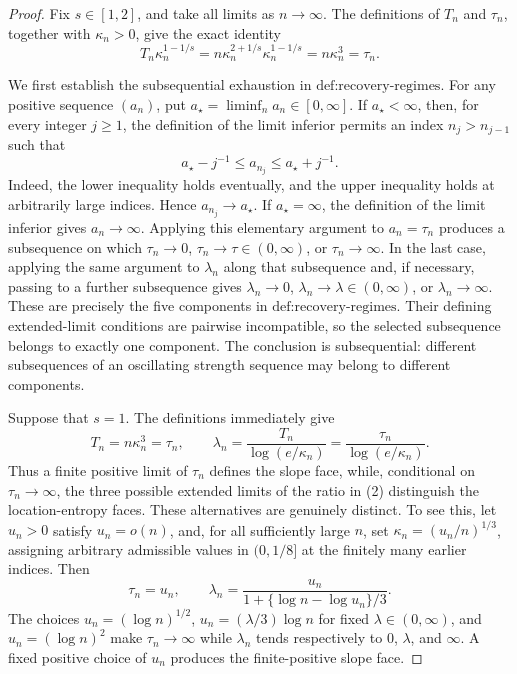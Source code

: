 \documentclass{article}
\begin{document}
\begin{proof}
Fix \(s\in[1,2]\), and take all limits as \(n\to\infty\).  The definitions of \(T_n\) and \(\tau_n\), together with \(\kappa_n>0\), give the exact identity
\[
 T_n\kappa_n^{1-1/s}
 =n\kappa_n^{2+1/s}\kappa_n^{1-1/s}
 =n\kappa_n^3
 =\tau_n.
 \tag{1}
\]

We first establish the subsequential exhaustion in \(\text{def:recovery-regimes}\).  For any positive sequence \((a_n)\), put \(a_\star=\liminf_n a_n\in[0,\infty]\).  If \(a_\star<\infty\), then, for every integer \(j\ge1\), the definition of the limit inferior permits an index \(n_j>n_{j-1}\) such that
\[
 a_\star-j^{-1}\le a_{n_j}\le a_\star+j^{-1}.
\]
Indeed, the lower inequality holds eventually, and the upper inequality holds at arbitrarily large indices.  Hence \(a_{n_j}\to a_\star\).  If \(a_\star=\infty\), the definition of the limit inferior gives \(a_n\to\infty\).  Applying this elementary argument to \(a_n=\tau_n\) produces a subsequence on which \(\tau_n\to0\), \(\tau_n\to\tau\in(0,\infty)\), or \(\tau_n\to\infty\).  In the last case, applying the same argument to \(\lambda_n\) along that subsequence and, if necessary, passing to a further subsequence gives \(\lambda_n\to0\), \(\lambda_n\to\lambda\in(0,\infty)\), or \(\lambda_n\to\infty\).  These are precisely the five components in \(\text{def:recovery-regimes}\).  Their defining extended-limit conditions are pairwise incompatible, so the selected subsequence belongs to exactly one component.  The conclusion is subsequential: different subsequences of an oscillating strength sequence may belong to different components.

Suppose that \(s=1\).  The definitions immediately give
\[
 T_n=n\kappa_n^3=\tau_n,
 \qquad
 \lambda_n=\frac{T_n}{\log(e/\kappa_n)}
 =\frac{\tau_n}{\log(e/\kappa_n)}.
 \tag{2}
\]
Thus a finite positive limit of \(\tau_n\) defines the slope face, while, conditional on \(\tau_n\to\infty\), the three possible extended limits of the ratio in (2) distinguish the location-entropy faces.  These alternatives are genuinely distinct.  To see this, let \(u_n>0\) satisfy \(u_n=o(n)\), and, for all sufficiently large \(n\), set \(\kappa_n=(u_n/n)^{1/3}\), assigning arbitrary admissible values in \((0,1/8]\) at the finitely many earlier indices.  Then
\[
 \tau_n=u_n,
 \qquad
 \lambda_n
 =\frac{u_n}{1+\{\log n-\log u_n\}/3}.
 \tag{3}
\]
The choices \(u_n=(\log n)^{1/2}\), \(u_n=(\lambda/3)\log n\) for fixed \(\lambda\in(0,\infty)\), and \(u_n=(\log n)^2\) make \(\tau_n\to\infty\) while \(\lambda_n\) tends respectively to \(0\), \(\lambda\), and \(\infty\).  A fixed positive choice of \(u_n\) produces the finite-positive slope face.


\end{proof}
\end{document}
